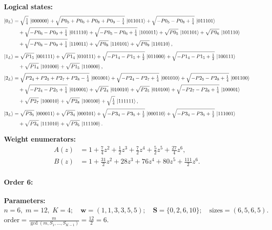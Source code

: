 \documentclass[11pt]{article}
\begin{document}
\noindent\textbf{Logical states:}
\begin{align*}
\ket{0_L} &= \sqrt{\tfrac{1}{4}}\,\ket{000000} + \sqrt{P0_5 + P0_6 + P0_8 + P0_9 - \tfrac{1}{4}}\,\ket{011011} + \sqrt{-P0_5 - P0_8 + \tfrac{1}{4}}\,\ket{011101}\\
&\quad + \sqrt{-P0_6 - P0_9 + \tfrac{1}{4}}\,\ket{011110} + \sqrt{-P0_5 - P0_6 + \tfrac{1}{4}}\,\ket{101011} + \sqrt{P0_5}\,\ket{101101} + \sqrt{P0_6}\,\ket{101110}\\
&\quad + \sqrt{-P0_8 - P0_9 + \tfrac{1}{4}}\,\ket{110011} + \sqrt{P0_8}\,\ket{110101} + \sqrt{P0_9}\,\ket{110110},
\\[2pt]
\ket{1_L} &= \sqrt{P1_5}\,\ket{001111} + \sqrt{P1_4}\,\ket{010111} + \sqrt{-P1_4 - P1_5 + \tfrac{1}{2}}\,\ket{011000} + \sqrt{-P1_4 - P1_5 + \tfrac{1}{2}}\,\ket{100111}\\
&\quad + \sqrt{P1_4}\,\ket{101000} + \sqrt{P1_5}\,\ket{110000},
\\[2pt]
\ket{2_L} &= \sqrt{P2_4 + P2_5 + P2_7 + P2_8 - \tfrac{1}{4}}\,\ket{001001} + \sqrt{-P2_4 - P2_7 + \tfrac{1}{4}}\,\ket{001010} + \sqrt{-P2_5 - P2_8 + \tfrac{1}{4}}\,\ket{001100}\\
&\quad + \sqrt{-P2_4 - P2_5 + \tfrac{1}{4}}\,\ket{010001} + \sqrt{P2_4}\,\ket{010010} + \sqrt{P2_5}\,\ket{010100} + \sqrt{-P2_7 - P2_8 + \tfrac{1}{4}}\,\ket{100001}\\
&\quad + \sqrt{P2_7}\,\ket{100010} + \sqrt{P2_8}\,\ket{100100} + \sqrt{\tfrac{1}{4}}\,\ket{111111},
\\[2pt]
\ket{3_L} &= \sqrt{P3_5}\,\ket{000011} + \sqrt{P3_4}\,\ket{000101} + \sqrt{-P3_4 - P3_5 + \tfrac{1}{2}}\,\ket{000110} + \sqrt{-P3_4 - P3_5 + \tfrac{1}{2}}\,\ket{111001}\\
&\quad + \sqrt{P3_4}\,\ket{111010} + \sqrt{P3_5}\,\ket{111100}.
\end{align*}

\noindent\textbf{Weight enumerators:}
\begin{align*}
A(z) &= 1 + \tfrac{7}{4}z^{2} + \tfrac{1}{2}z^{3} + \tfrac{7}{2}z^{4} + \tfrac{5}{2}z^{5} + \tfrac{27}{4}z^{6},\\[2pt]
B(z) &= 1 + \tfrac{31}{2}z^{2} + 28z^{3} + 76z^{4} + 80z^{5} + \tfrac{111}{2}z^{6}.
\end{align*}

\paragraph{\textbf{Order 6:}} 

\noindent\textbf{Parameters:} $n=6,\; m=12,\; K=4;\quad \mathbf w=(1, 1, 3, 3, 5, 5);\quad \mathbf S=\{0, 2, 6, 10\};\quad \text{sizes}=\left(6, 5, 6, 5\right).$ $\displaystyle \text{order}=\frac{m}{\gcd(m,S_1,\dots,S_{K-1})}=\frac{12}{2}=6.$
\end{document}
